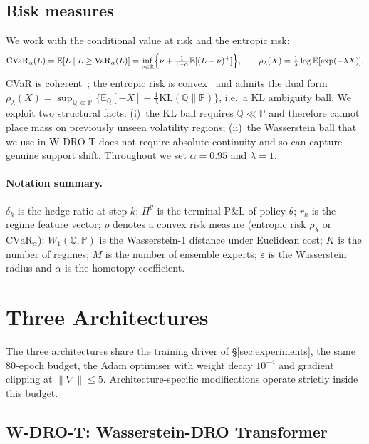 \documentclass[10pt,letterpaper]{article}
\newcommand{\cvar}{\mathrm{CVaR}}
\newcommand{\VaR}{\mathrm{VaR}}
\newcommand{\E}{\mathbb{E}}
\newcommand{\PP}{\mathbb{P}}
\newcommand{\QQ}{\mathbb{Q}}
\newcommand{\R}{\mathbb{R}}
\newcommand{\Wone}{W_{1}}
\begin{document}
\subsection{Risk measures}

We work with the conditional value at risk and the entropic risk:
\begin{equation}
\cvar_\alpha(L) = \E[L\mid L\ge \VaR_\alpha(L)]
= \inf_{\nu\in\R}\Bigl\{\nu+\tfrac{1}{1-\alpha}\E[(L-\nu)^+]\Bigr\},
\qquad
\rho_\lambda(X)=\tfrac{1}{\lambda}\log\E[\exp(-\lambda X)].
\label{eq:risks}
\end{equation}
CVaR is coherent~\citep{artzner1999coherent,rockafellar2000optimization};
the entropic risk is convex~\citep{follmer2002convex} and admits the
dual form
$\rho_\lambda(X)=\sup_{\QQ\ll\PP}\{\E_\QQ[-X]-\tfrac{1}{\lambda}\mathrm{KL}(\QQ\|\PP)\}$,
i.e.\ a KL ambiguity ball. We exploit two structural facts:
(i)~the KL ball requires $\QQ\ll\PP$ and therefore cannot place mass
on previously unseen volatility regions; (ii)~the Wasserstein ball
that we use in W-DRO-T does not require absolute continuity and so
can capture genuine support shift. Throughout we set $\alpha=0.95$
and $\lambda=1$.

\paragraph{Notation summary.}
$\delta_k$ is the hedge ratio at step $k$; $\Pi^\theta$ is the
terminal P\&L of policy $\theta$; $r_k$ is the regime feature vector;
$\rho$ denotes a convex risk measure (entropic risk $\rho_\lambda$
or $\cvar_\alpha$); $\Wone(\QQ,\PP)$ is the Wasserstein-1 distance
under Euclidean cost; $K$ is the number of regimes; $M$ is the
number of ensemble experts; $\varepsilon$ is the Wasserstein radius
and $\alpha$ is the homotopy coefficient.

\section{Three Architectures}\label{sec:methods}

The three architectures share the training driver of
\S\ref{sec:experiments}, the same $80$-epoch budget, the Adam
optimiser with weight decay $10^{-4}$ and gradient clipping at
$\|\nabla\|\le 5$. Architecture-specific modifications operate
strictly inside this budget.

\subsection{W-DRO-T: Wasserstein-DRO Transformer}\label{sec:wdrot}
\end{document}
